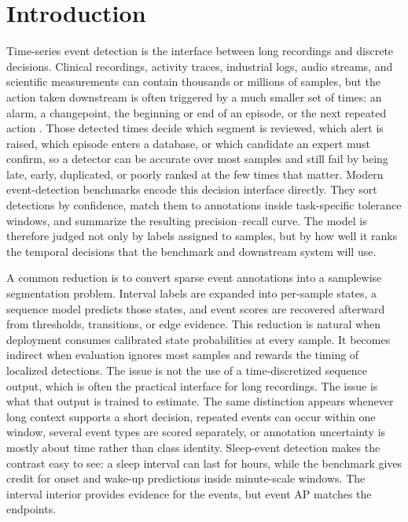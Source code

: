 \section{Introduction}
\label{sec:introduction}

Time-series event detection is the interface between long recordings and discrete decisions.
Clinical recordings, activity traces, industrial logs, audio streams, and scientific measurements can contain thousands or millions of samples, but the action taken downstream is often triggered by a much smaller set of times: an alarm, a changepoint, the beginning or end of an episode, or the next repeated action \citep{guralnik1999,aminikhanghahi2017,shoeb2010,goldberger2000,alexander2017,esper2023,azib2023universal}.
Those detected times decide which segment is reviewed, which alert is raised, which episode enters a database, or which candidate an expert must confirm, so a detector can be accurate over most samples and still fail by being late, early, duplicated, or poorly ranked at the few times that matter.
Modern event-detection benchmarks encode this decision interface directly.
They sort detections by confidence, match them to annotations inside task-specific tolerance windows, and summarize the resulting precision--recall curve.
The model is therefore judged not only by labels assigned to samples, but by how well it ranks the temporal decisions that the benchmark and downstream system will use.

A common reduction is to convert sparse event annotations into a samplewise segmentation problem.
Interval labels are expanded into per-sample states, a sequence model predicts those states, and event scores are recovered afterward from thresholds, transitions, or edge evidence.
This reduction is natural when deployment consumes calibrated state probabilities at every sample.
It becomes indirect when evaluation ignores most samples and rewards the timing of localized detections.
The issue is not the use of a time-discretized sequence output, which is often the practical interface for long recordings.
The issue is what that output is trained to estimate.
The same distinction appears whenever long context supports a short decision, repeated events can occur within one window, several event types are scored separately, or annotation uncertainty is mostly about time rather than class identity.
Sleep-event detection makes the contrast easy to see: a sleep interval can last for hours, while the benchmark gives credit for onset and wake-up predictions inside minute-scale windows.
The interval interior provides evidence for the events, but event AP matches the endpoints.


